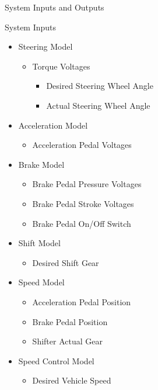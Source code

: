 \documentclass{beamer}
\begin{document}
\begin{frame}{System Inputs and Outputs}
\begin{minipage}[t]{0.48\linewidth}
\tiny
	\begin{block}{System Inputs}
		\begin{itemize}
			\tiny
		    \item Steering Model
		    \begin{itemize}
		    \tiny
		    		\item Torque Voltages
		    		\begin{itemize}
		    		\tiny
		    			\item Desired Steering Wheel Angle
		    			\item Actual Steering Wheel Angle
		    		\end{itemize}
		    \end{itemize}
		    \item Acceleration Model
		    \begin{itemize}
		    \tiny
		    		\item Acceleration Pedal Voltages
		    \end{itemize}
		    \item Brake Model
		    \begin{itemize}
		    \tiny
		    		\item Brake Pedal Pressure Voltages
		    		\item Brake Pedal Stroke Voltages 
		    		\item Brake Pedal On/Off Switch
		    \end{itemize}
		    \item Shift Model
		    \begin{itemize}
		    \tiny
		    		\item Desired Shift Gear
		    \end{itemize}
		    \item Speed Model
		    \begin{itemize}
		    \tiny
		    		\item Acceleration Pedal Position
		    		\item Brake Pedal Position
		    		\item Shifter Actual Gear
		    \end{itemize}
		    \item Speed Control Model
		    \begin{itemize}
		    \tiny
		    		\item Desired Vehicle Speed
		    \end{itemize}
		\end{itemize}

\end{block}
\end{minipage}
\end{frame}
\end{document}
